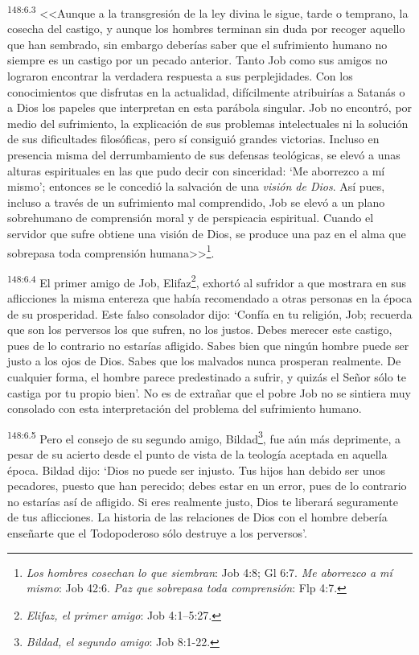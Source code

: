 \par 
\textsuperscript{148:6.3} <<Aunque a la transgresión de la ley divina le sigue, tarde o temprano, la cosecha del castigo, y aunque los hombres terminan sin duda por recoger aquello que han sembrado, sin embargo deberías saber que el sufrimiento humano no siempre es un castigo por un pecado anterior. Tanto Job como sus amigos no lograron encontrar la verdadera respuesta a sus perplejidades. Con los conocimientos que disfrutas en la actualidad, difícilmente atribuirías a Satanás o a Dios los papeles que interpretan en esta parábola singular. Job no encontró, por medio del sufrimiento, la explicación de sus problemas intelectuales ni la solución de sus dificultades filosóficas, pero sí consiguió grandes victorias. Incluso en presencia misma del derrumbamiento de sus defensas teológicas, se elevó a unas alturas espirituales en las que pudo decir con sinceridad: `Me aborrezco a mí mismo'; entonces se le concedió la salvación de una \textit{visión de Dios}. Así pues, incluso a través de un sufrimiento mal comprendido, Job se elevó a un plano sobrehumano de comprensión moral y de perspicacia espiritual. Cuando el servidor que sufre obtiene una visión de Dios, se produce una paz en el alma que sobrepasa toda comprensión humana>>\footnote{\textit{Los hombres cosechan lo que siembran}: Job 4:8; Gl 6:7. \textit{Me aborrezco a mí mismo}: Job 42:6. \textit{Paz que sobrepasa toda comprensión}: Flp 4:7.}.

\par 
\textsuperscript{148:6.4} \guillemotleft El primer amigo de Job, Elifaz\footnote{\textit{Elifaz, el primer amigo}: Job 4:1--5:27.}, exhortó al sufridor a que mostrara en sus aflicciones la misma entereza que había recomendado a otras personas en la época de su prosperidad. Este falso consolador dijo: `Confía en tu religión, Job; recuerda que son los perversos los que sufren, no los justos. Debes merecer este castigo, pues de lo contrario no estarías afligido. Sabes bien que ningún hombre puede ser justo a los ojos de Dios. Sabes que los malvados nunca prosperan realmente. De cualquier forma, el hombre parece predestinado a sufrir, y quizás el Señor sólo te castiga por tu propio bien'. No es de extrañar que el pobre Job no se sintiera muy consolado con esta interpretación del problema del sufrimiento humano\guillemotright.

\par 
\textsuperscript{148:6.5} \guillemotleft Pero el consejo de su segundo amigo, Bildad\footnote{\textit{Bildad, el segundo amigo}: Job 8:1-22.}, fue aún más deprimente, a pesar de su acierto desde el punto de vista de la teología aceptada en aquella época. Bildad dijo: `Dios no puede ser injusto. Tus hijos han debido ser unos pecadores, puesto que han perecido; debes estar en un error, pues de lo contrario no estarías así de afligido. Si eres realmente justo, Dios te liberará seguramente de tus aflicciones. La historia de las relaciones de Dios con el hombre debería enseñarte que el Todopoderoso sólo destruye a los perversos'.\guillemotright

